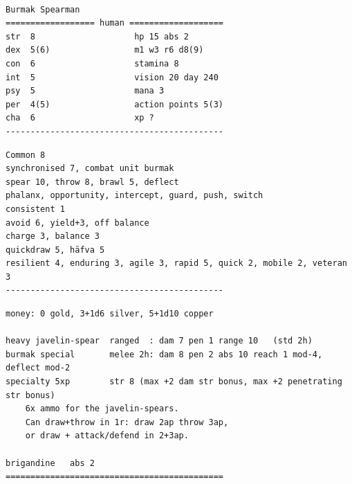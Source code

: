 \

\goodbreak \small \begin{samepage} \begin{verbatim}
Burmak Spearman
================== human ===================
str  8                    hp 15 abs 2
dex  5(6)                 m1 w3 r6 d8(9)
con  6                    stamina 8
int  5                    vision 20 day 240
psy  5                    mana 3
per  4(5)                 action points 5(3)
cha  6                    xp ?
--------------------------------------------
\end{verbatim} \goodbreak \begin{verbatim}
Common 8
synchronised 7, combat unit burmak
spear 10, throw 8, brawl 5, deflect
phalanx, opportunity, intercept, guard, push, switch
consistent 1
avoid 6, yield+3, off balance
charge 3, balance 3
quickdraw 5, häfva 5
resilient 4, enduring 3, agile 3, rapid 5, quick 2, mobile 2, veteran 3
--------------------------------------------
\end{verbatim} \goodbreak \begin{verbatim}
money: 0 gold, 3+1d6 silver, 5+1d10 copper

heavy javelin-spear  ranged  : dam 7 pen 1 range 10   (std 2h)
burmak special       melee 2h: dam 8 pen 2 abs 10 reach 1 mod-4, deflect mod-2
specialty 5xp        str 8 (max +2 dam str bonus, max +2 penetrating str bonus)
    6x ammo for the javelin-spears. 
    Can draw+throw in 1r: draw 2ap throw 3ap, 
    or draw + attack/defend in 2+3ap.
        
brigandine   abs 2
============================================
\end{verbatim} \end{samepage} \normalsize






























\clearpage
\raggedbottom
